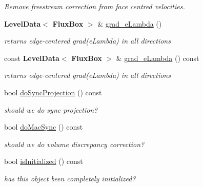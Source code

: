 \begin{DoxyCompactItemize}
\begin{DoxyCompactList}\small\item\em Remove freestream correction from face centred velocities. \end{DoxyCompactList}\item 
\textbf{ Level\+Data}$<$ \textbf{ Flux\+Box} $>$ \& \hyperlink{class_projector_a63fba24063458770cdc25a630fad02f2}{grad\+\_\+e\+Lambda} ()
\begin{DoxyCompactList}\small\item\em returns edge-\/centered grad(e\+Lambda) in all directions \end{DoxyCompactList}\item 
\mbox{\label{class_projector_a22a97a48cce9731ff6b9f9c80fc0af51}} 
const \textbf{ Level\+Data}$<$ \textbf{ Flux\+Box} $>$ \& \hyperlink{class_projector_a22a97a48cce9731ff6b9f9c80fc0af51}{grad\+\_\+e\+Lambda} () const
\begin{DoxyCompactList}\small\item\em returns edge-\/centered grad(e\+Lambda) in all directions \end{DoxyCompactList}\item 
\mbox{\label{class_projector_a85ae1986ae8342810df272b4df98c609}} 
bool \hyperlink{class_projector_a85ae1986ae8342810df272b4df98c609}{do\+Sync\+Projection} () const
\begin{DoxyCompactList}\small\item\em should we do sync projection? \end{DoxyCompactList}\item 
\mbox{\label{class_projector_a71e658f3576ab11b891908e00405db8d}} 
bool \hyperlink{class_projector_a71e658f3576ab11b891908e00405db8d}{do\+Mac\+Sync} () const
\begin{DoxyCompactList}\small\item\em should we do volume discrepancy correction? \end{DoxyCompactList}\item 
\mbox{\label{class_projector_a1c93789693717e75855827647f72a5dc}} 
bool \hyperlink{class_projector_a1c93789693717e75855827647f72a5dc}{is\+Initialized} () const
\begin{DoxyCompactList}\small\item\em has this object been completely initialized? \end{DoxyCompactList}\item 

\end{DoxyCompactItemize}
